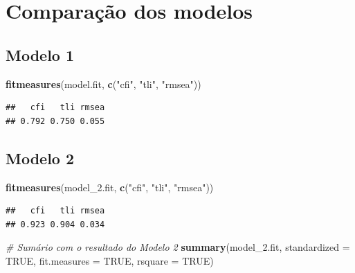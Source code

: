 \documentclass[
  12pt,
]{article}
\newenvironment{Shaded}{\begin{snugshade}}{\end{snugshade}}
\newcommand{\CommentTok}[1]{\textcolor[rgb]{0.56,0.35,0.01}{\textit{#1}}}
\newcommand{\DataTypeTok}[1]{\textcolor[rgb]{0.13,0.29,0.53}{#1}}
\newcommand{\FloatTok}[1]{\textcolor[rgb]{0.00,0.00,0.81}{#1}}
\newcommand{\KeywordTok}[1]{\textcolor[rgb]{0.13,0.29,0.53}{\textbf{#1}}}
\newcommand{\NormalTok}[1]{#1}
\newcommand{\OtherTok}[1]{\textcolor[rgb]{0.56,0.35,0.01}{#1}}
\newcommand{\StringTok}[1]{\textcolor[rgb]{0.31,0.60,0.02}{#1}}
\begin{document}
\normalsize
\onehalfspacing

\hypertarget{comparauxe7uxe3o-dos-modelos}{%
\section{Comparação dos modelos}\label{comparauxe7uxe3o-dos-modelos}}

\hypertarget{modelo-1}{%
\subsection{Modelo 1}\label{modelo-1}}

\scriptsize
\singlespacing

\begin{Shaded}
\begin{Highlighting}[]
\KeywordTok{fitmeasures}\NormalTok{(model.fit, }\KeywordTok{c}\NormalTok{(}\StringTok{"cfi"}\NormalTok{, }\StringTok{"tli"}\NormalTok{, }\StringTok{"rmsea"}\NormalTok{))}
\end{Highlighting}
\end{Shaded}

\begin{verbatim}
##   cfi   tli rmsea 
## 0.792 0.750 0.055
\end{verbatim}

\normalsize
\onehalfspacing

\hypertarget{modelo-2-1}{%
\subsection{Modelo 2}\label{modelo-2-1}}

\scriptsize
\singlespacing

\begin{Shaded}
\begin{Highlighting}[]
\KeywordTok{fitmeasures}\NormalTok{(model\_}\FloatTok{2.}\NormalTok{fit, }\KeywordTok{c}\NormalTok{(}\StringTok{"cfi"}\NormalTok{, }\StringTok{"tli"}\NormalTok{, }\StringTok{"rmsea"}\NormalTok{))}
\end{Highlighting}
\end{Shaded}

\begin{verbatim}
##   cfi   tli rmsea 
## 0.923 0.904 0.034
\end{verbatim}

\begin{Shaded}
\begin{Highlighting}[]
\CommentTok{\# Sumário com o resultado do Modelo 2}
\KeywordTok{summary}\NormalTok{(model\_}\FloatTok{2.}\NormalTok{fit,}
\DataTypeTok{standardized =} \OtherTok{TRUE}\NormalTok{,}
\DataTypeTok{fit.measures =} \OtherTok{TRUE}\NormalTok{,}
\DataTypeTok{rsquare =} \OtherTok{TRUE}\NormalTok{)}
\end{Highlighting}
\end{Shaded}
\end{document}
